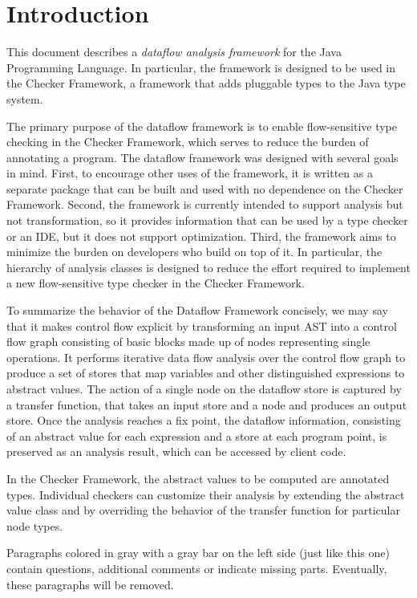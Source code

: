 
\section{Introduction}

This document describes a \emph{dataflow analysis framework} for the Java Programming Language.
In particular, the framework is designed to be used in the Checker Framework, a framework
that adds pluggable types to the Java type system.

The primary purpose of the dataflow framework is to enable flow-sensitive type checking in the Checker Framework, which serves to reduce the burden of annotating a program.  The dataflow framework was designed with several goals in mind.  First, to encourage other uses of the framework, it is written as a separate package that can be built and used with no dependence on the Checker Framework.  Second, the framework is currently intended to support analysis but not transformation, so it provides information that can be used by a type checker or an IDE, but it does not support optimization.  Third, the framework aims to minimize the burden on developers who build on top of it.  In particular, the hierarchy of analysis classes is designed to reduce the effort required to implement a new flow-sensitive type checker in the Checker Framework.

To summarize the behavior of the Dataflow Framework concisely, we may say that it makes control flow explicit by transforming an input AST into a control flow graph consisting of basic blocks made up of nodes representing single operations.  It performs iterative data flow analysis over the control flow graph to produce a set of stores that map variables and other distinguished expressions to abstract values.  The action of a single node on the dataflow store is captured by a transfer function, that takes an input store and a node and produces an output store.  Once the analysis reaches a fix point, the dataflow information, consisting of an abstract value for each expression and a store at each program point, is preserved as an analysis result, which can be accessed by client code.

In the Checker Framework, the abstract values to be computed are annotated types.  Individual checkers can customize their analysis by extending the abstract value class and by overriding the behavior of the transfer function for particular node types.

\begin{workinprogress}    
    Paragraphs colored in gray with a gray bar on the left side (just like this one)
    contain questions, additional comments or indicate missing parts. Eventually, these
    paragraphs will be removed.
\end{workinprogress}





